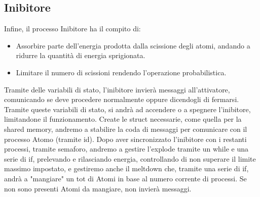 \documentclass{article}
\begin{document}
\subsection{Inibitore}
Infine, il processo Inibitore ha il compito di:
\begin{itemize}
\item Assorbire parte dell'energia prodotta dalla scissione degli atomi, andando a ridurre la quantità di energia sprigionata.
\item Limitare il numero di scissioni rendendo l'operazione probabilistica.
\end{itemize}
Tramite delle variabili di stato, l'inibitore invierà messaggi all'attivatore, comunicando se deve procedere normalmente oppure dicendogli di fermarsi. 
Tramite queste variabili di stato, si andrà ad accendere o a spegnere l'inibitore, limitandone il funzionamento.
Create le struct necessarie, come quella per la shared memory, andremo a stabilire la coda di messaggi per comunicare con il processo Atomo (tramite id).
Dopo aver sincronizzato l'inibitore con i restanti processi, tramite semaforo, andremo a gestire l'explode tramite un while e una serie di if, prelevando e rilasciando energia, controllando di non superare il limite massimo impostato, e gestiremo anche il meltdown che, tramite una serie di if, andrà a "mangiare" un tot di Atomi in base al numero corrente di processi. Se non sono presenti Atomi da mangiare, non invierà messaggi.
\end{document}
